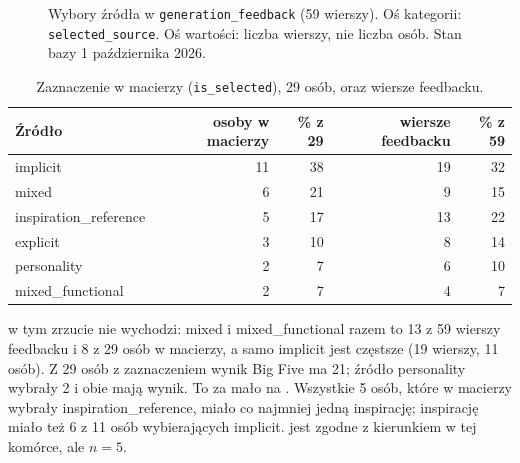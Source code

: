 \begin{figure}[htbp]
  \centering
  \caption{Wybory źródła w \texttt{generation\_feedback} (59 wierszy). Oś kategorii: \texttt{selected\_source}. Oś wartości: liczba wierszy, nie liczba osób. Stan bazy 1 października 2026.}
  \label{fig:ch08:selected-source}
\end{figure}

\begin{table}[htbp]
  \centering
  \small
  \caption{Zaznaczenie w macierzy (\texttt{is\_selected}), 29 osób, oraz wiersze feedbacku.}
  \label{tab:ch08:sources}
  \begin{tabular}{lrrrr}
    \toprule
    Źródło & osoby w macierzy & \% z 29 & wiersze feedbacku & \% z 59 \\
    \midrule
    implicit & 11 & 38 & 19 & 32 \\
    mixed & 6 & 21 & 9 & 15 \\
    inspiration\_reference & 5 & 17 & 13 & 22 \\
    explicit & 3 & 10 & 8 & 14 \\
    personality & 2 & 7 & 6 & 10 \\
    mixed\_functional & 2 & 7 & 4 & 7 \\
    \bottomrule
  \end{tabular}
\end{table}

\noindent
{} w tym zrzucie nie wychodzi: mixed i mixed\_functional razem to 13 z 59 wierszy feedbacku i 8 z 29 osób w macierzy, a samo implicit jest częstsze (19 wierszy, 11 osób).
Z 29 osób z zaznaczeniem wynik Big Five ma 21; źródło personality wybrały 2 i obie mają wynik. To za mało na .
Wszystkie 5 osób, które w macierzy wybrały inspiration\_reference, miało co najmniej jedną inspirację; inspirację miało też 6 z 11 osób wybierających implicit.  jest zgodne z kierunkiem w tej komórce, ale $n=5$.

